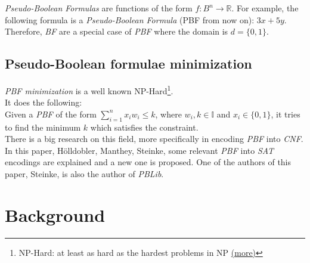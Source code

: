 \emph{Pseudo-Boolean Formulas} are functions of the form $f:B^n \rightarrow \mathbb{R}$. For example, the following formula is a \emph{Pseudo-Boolean Formula} (PBF from now on): $3x+5y$. Therefore, \emph{BF} are a special case of \emph{PBF} where the domain is $d=\{0,1\}$.\\



\subsection{Pseudo-Boolean formulae minimization}
\emph{PBF minimization} is a well known NP-Hard\footnote{NP-Hard: at least as hard as the hardest problems in NP \href{https://en.wikipedia.org/wiki/NP-hardness}{(more)}}. \\
It does the following:\\
Given a \emph{PBF} of the form $\sum_{i=1}^{n} x_{i}w_{i} \leq k$, where $w_{i},k \in \mathbb{I}$ and $x_{i} \in \{0,1\}$, it tries to find the minimum $k$ which satisfies the constraint.\\

There is a big research on this field, more specifically in encoding \emph{PBF} into \emph{CNF}. In this paper, Hölldobler, Manthey, Steinke\cite{Holldobler}, some relevant \emph{PBF} into \emph{SAT} encodings are explained and a new one is proposed. One of the authors of this paper, Steinke, is also the author of \emph{PBLib}.  

\section{Background}

